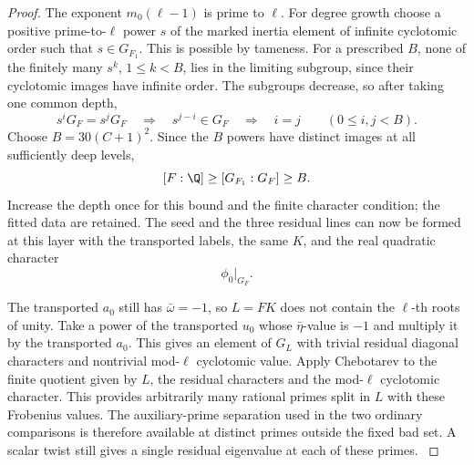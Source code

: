 \begin{proof}
The exponent \(m_0(\ell-1)\) is prime to \(\ell\).
For degree growth choose a positive prime-to-\(\ell\)
power \(s\) of the marked inertia element of
infinite cyclotomic order such that \(s\in G_{F_1}\).
This is possible by tameness. For a prescribed \(B\), none of the finitely many \(s^k\), \(1\le k<B\), lies in the limiting subgroup, since their cyclotomic images have infinite order. The subgroups decrease, so after taking one common depth,
\[
 s^iG_F=s^jG_F\quad\Longrightarrow\quad s^{j-i}\in G_F
 \quad\Longrightarrow\quad i=j\qquad(0\le i,j<B).
\]
Choose \(B=30(C+1)^2\). Since the \(B\) powers have distinct images at all sufficiently
deep levels,
\[
 [F:\Q]\ge[G_{F_1}:G_F]\ge B.
\]
Increase the depth
once for this bound and the finite character condition; the fitted
data are retained. The seed
and the three residual lines can now be formed
at this layer with the transported labels, the
same \(K\), and the real quadratic character
\[
 \phi_0|_{G_F}.
\]


The transported \(a_0\) still has \(\bar\omega=-1\),
so \(L=FK\) does not contain the \(\ell\)-th roots
of unity. Take a power of the transported \(u_0\)
whose \(\bar\eta\)-value is \(-1\) and multiply
it by the transported \(a_0\). This gives an element
of \(G_L\) with trivial residual diagonal characters
and nontrivial mod-\(\ell\) cyclotomic value. Apply
Chebotarev to the finite quotient given by \(L\),
the residual characters and the mod-\(\ell\) cyclotomic
character. This provides arbitrarily many rational
primes split in \(L\) with these Frobenius values.
The auxiliary-prime separation used in the two
ordinary comparisons is therefore available at
distinct primes outside the fixed bad set. A scalar
twist still gives a single residual eigenvalue at
each of these primes.
\label{cor:ordinary-count-ii-tower-1}
\end{proof}
